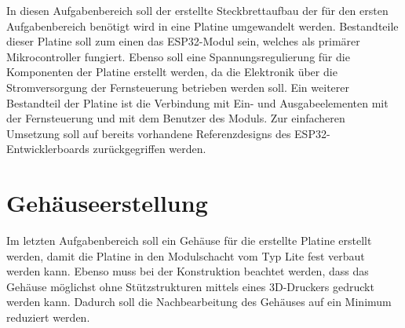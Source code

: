 In diesen Aufgabenbereich soll der erstellte Steckbrettaufbau der für den ersten Aufgabenbereich benötigt wird in eine Platine umgewandelt werden. Bestandteile dieser Platine soll zum einen das ESP32-Modul sein, welches als primärer Mikrocontroller fungiert. Ebenso soll eine Spannungsregulierung für die Komponenten der Platine erstellt werden, da die Elektronik über die Stromversorgung der Fernsteuerung betrieben werden soll. Ein weiterer Bestandteil der Platine ist die Verbindung mit Ein- und Ausgabeelementen mit der Fernsteuerung und mit dem Benutzer des Moduls. Zur einfacheren Umsetzung soll auf bereits vorhandene Referenzdesigns des ESP32-Entwicklerboards zurückgegriffen werden.

\section{Gehäuseerstellung}

Im letzten Aufgabenbereich soll ein Gehäuse für die erstellte Platine erstellt werden, damit die Platine in den Modulschacht vom Typ Lite fest verbaut werden kann. Ebenso muss bei der Konstruktion beachtet werden, dass das Gehäuse möglichst ohne Stützstrukturen mittels eines 3D-Druckers gedruckt werden kann. Dadurch soll die Nachbearbeitung des Gehäuses auf ein Minimum reduziert werden.
